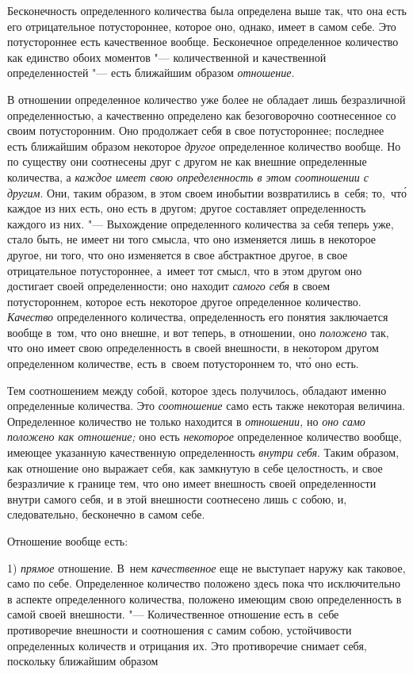 Бесконечность определенного количества была определена выше так, что она
есть его отрицательное потустороннее, которое оно, однако, имеет в самом
себе. Это потустороннее есть качественное вообще. Бесконечное определенное
количество как единство обоих моментов "--- количественной и качественной
определенностей "--- есть ближайшим образом {\em отношение}.

В отношении определенное количество уже более не обладает лишь безразличной
определенностью, а качественно определено как безоговорочно соотнесенное со
своим потусторонним. Оно продолжает себя в свое потустороннее; последнее есть
ближайшим образом некоторое {\em другое} определенное количество вообще. Но по
существу они соотнесены друг с другом не как внешние определенные количества, а
{\em каждое имеет свою определенность в этом соотношении с другим}. Они, таким
образом, в этом своем инобытии возвратились в~себя; то,~чт\'{о} каждое из них
есть, оно есть в другом; другое составляет определенность каждого из них. "---
Выхождение определенного количества за себя теперь уже, стало быть, не имеет ни
того смысла, что оно изменяется лишь в некоторое другое, ни того, что оно
изменяется в свое абстрактное другое, в свое отрицательное потустороннее,
а~имеет тот смысл, что в этом другом оно достигает своей определенности; оно
находит {\em самого себя} в своем потустороннем, которое есть некоторое другое
определенное количество. {\em Качество} определенного количества,
определенность его понятия заключается вообще в~том, что оно внешне, и вот
теперь, в отношении, оно {\em положено} так, что оно имеет свою определенность
в своей внешности, в некотором другом определенном количестве, есть в~своем
потустороннем то, чт\'{о} оно есть.

Тем соотношением между собой, которое здесь получилось, обладают именно
определенные количества. Это {\em соотношение} само есть также некоторая
величина. Определенное количество не только находится в {\em отношении,} но
{\em оно само положено как отношение;} оно есть {\em некоторое} определенное
количество вообще, имеющее указанную качественную определенность
{\em внутри себя}. Таким образом, как отношение оно выражает себя, как
замкнутую в себе целостность, и свое безразличие к границе тем, что оно имеет
внешность своей определенности внутри самого себя, и в этой внешности
соотнесено лишь с собою, и, следовательно, бесконечно в самом себе.

Отношение вообще есть:

1) {\em прямое} отношение. В~нем {\em качественное} еще не выступает наружу как
таковое, само по себе. Определенное количество положено здесь пока что
исключительно в аспекте определенного количества, положено имеющим свою
определенность в самой своей внешности. "--- Количественное отношение есть
в~себе противоречие внешности и соотношения с самим собою, устойчивости
определенных количеств и отрицания их. Это противоречие снимает себя, поскольку
ближайшим образом

